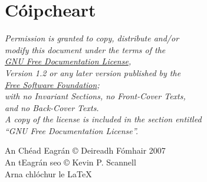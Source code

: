 

\newpage
\chapter*{C\'oipcheart} 

\begin{center}
\textit{Permission is granted to copy, distribute and/or \\
modify this document under the terms of the \\
\href{http://www.gnu.org/copyleft/fdl.html}{GNU Free Documentation License}, \\
Version 1.2 or any later version published by the \\
\href{http://www.gnu.org/fsf/fsf.html}{Free Software Foundation}; \\
with no Invariant Sections, no Front-Cover Texts, \\
and no Back-Cover Texts. \\
A copy of the license is included in the section entitled \\
``GNU Free Documentation License''.}
\vspace{7ex}

An Ch\'ead Eagr\'an \copyright \hspace{0.6ex} Deireadh F\'omhair 2007 \\
\vspace{1ex}
An tEagr\'an seo 
\copyright \hspace{0.6ex} Kevin P. Scannell \the\year \\
\vspace{20ex}
{\small Arna chl\'ochur le \LaTeX}
\end{center}



\newpage
